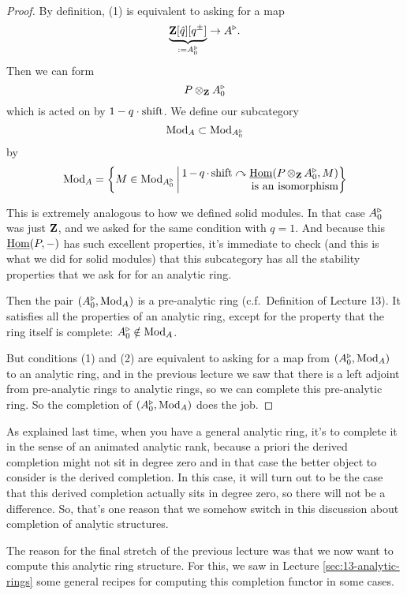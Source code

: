 \begin{proof}
By definition, (1) is equivalent to asking for a map
\[
  \underbrace{\mathbf Z[\hat q][q^\pm]}_{\mathrel{:=} A_0^\triangleright} \to A^\triangleright.
\]
Then we can form
\[ P\otimes_\mathbf Z A_0^\triangleright \]
which is acted on by $1-q\cdot\mathrm{shift}$. We define our subcategory
\[ \operatorname{Mod}_A \subset \operatorname{Mod}_{A_0^\triangleright} \]
by
\[
  \Mod_A = \left\{
    M \in \Mod_{A_0^\tri}
    \,\middle|\,
    \parbox[c]{5cm}{\raggedleft$1-q\cdot\shift\actson\ul\Hom(P\tnsr_\Z A_0^\tri,M)$\\is an isomorphism}
  \right\}
\]

This is extremely analogous to how we defined solid modules. In that case $A^\triangleright_0$ was just $\mathbf Z$, and we asked for the same condition with $q=1$. And because this $\underline{\operatorname{Hom}}(P,-)$ has such excellent properties, it's immediate to check (and this is what we did for solid modules) that this subcategory has all the stability properties that we ask for for an analytic ring.

Then the pair $(A_0^\triangleright,\operatorname{Mod}_A)$ is a pre-analytic ring (c.f.\ Definition \citeme{} of Lecture 13). It satisfies all the properties of an analytic ring, except for the property that the ring itself is complete: $A^\triangleright_0\notin\operatorname{Mod}_A$.

But conditions (1) and (2) are equivalent to asking for a map from $(A_0^\triangleright,\operatorname{Mod}_A)$ to an analytic ring, and in the previous lecture we saw that there is a left adjoint from pre-analytic rings to analytic rings, so we can complete this pre-analytic ring. So the completion of $(A_0^\triangleright,\operatorname{Mod}_A)$ does the job.
\end{proof}

As explained last time, when you have a general analytic ring, it's to complete it in the sense of an animated analytic rank, because a priori the derived completion might not sit in degree zero and in that case the better object to consider is the derived completion. In this case, it will turn out to be the case that this derived completion actually sits in degree zero, so there will not be a difference. So, that's one reason that we somehow switch in this discussion about completion of analytic structures.

The reason for the final stretch of the previous lecture was that we now want to compute this analytic ring structure. For this, we saw in Lecture \ref{sec:13-analytic-rings} some general recipes for computing this completion functor in some cases.

